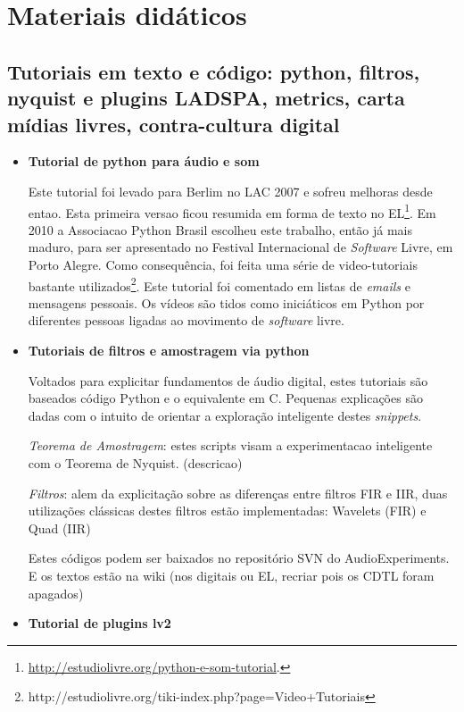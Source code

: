 \section{Materiais didáticos}

  \subsection{ Tutoriais em texto e código: python, filtros, nyquist e plugins LADSPA, metrics, carta mídias livres, contra-cultura digital }\label{subsec:tuts}

\begin{itemize}
    \item {\bf Tutorial de python para áudio e som}

Este tutorial foi levado para Berlim no LAC 2007 e sofreu melhoras desde entao. Esta
primeira versao ficou resumida em forma de texto no EL\footnote{\url{http://estudiolivre.org/python-e-som-tutorial}.}. Em 2010
a Associacao Python Brasil escolheu este trabalho, então já mais maduro, para ser apresentado no
Festival Internacional de \emph{Software} Livre, em Porto Alegre. Como consequência, foi feita uma série de video-tutoriais bastante utilizados\footnote{http://estudiolivre.org/tiki-index.php?page=Video+Tutoriais}.
Este tutorial foi comentado em listas de \emph{emails} e mensagens pessoais. Os vídeos são tidos como iniciáticos em Python por diferentes pessoas ligadas ao movimento de \emph{software} livre.

    \item {\bf Tutoriais de filtros e amostragem via python }

Voltados para explicitar fundamentos de áudio digital, estes tutoriais
são baseados código Python e o equivalente em C. Pequenas explicações são
dadas com o intuito de orientar a exploração inteligente destes \emph{snippets}.

\emph{Teorema de Amostragem}: estes scripts visam a experimentacao inteligente com
o Teorema de Nyquist. (descricao)

\emph{Filtros}: alem da explicitação sobre as diferenças entre filtros FIR e IIR,
duas utilizações clássicas destes filtros estão implementadas: Wavelets (FIR) e Quad (IIR)

Estes códigos podem ser baixados no repositório SVN do AudioExperiments. E os textos estão
na wiki (nos digitais ou EL, recriar pois os CDTL foram apagados)

    \item {\bf Tutorial de plugins lv2}


\end{itemize}
